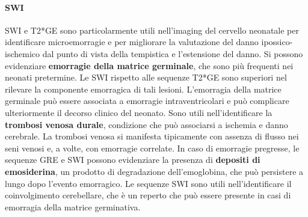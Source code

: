 \paragraph{SWI} SWI e T2*GE sono particolarmente utili nell'imaging del cervello neonatale per identificare microemorragie e per migliorare la valutazione del danno ipossico-ischemico dal punto di vista della tempistica e l'estensione del danno. Si possono evidenziare \textbf{emorragie della matrice germinale}, che sono più frequenti nei neonati pretermine. Le SWI rispetto alle sequenze T2*GE sono superiori nel rilevare la componente emorragica di tali lesioni. L'emorragia della matrice germinale può essere associata a emorragie intraventricolari e può complicare ulteriormente il decorso clinico del neonato. Sono utili nell'identificare la \textbf{trombosi venosa durale}, condizione che può associarsi a ischemia e danno cerebrale. La trombosi venosa si manifesta tipicamente con assenza di flusso nei seni venosi e, a volte, con emorragie correlate. In caso di emorragie pregresse, le sequenze GRE e SWI possono evidenziare la presenza di \textbf{depositi di emosiderina}, un prodotto di degradazione dell'emoglobina, che può persistere a lungo dopo l'evento emorragico. Le sequenze SWI sono utili nell'identificare il coinvolgimento cerebellare, che è un reperto che può essere presente in casi di emorragia della matrice germinativa.

